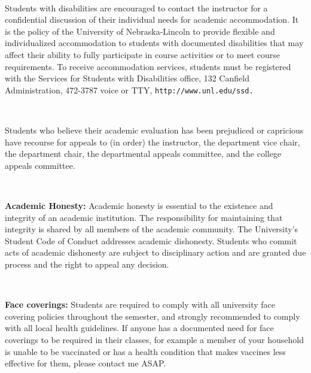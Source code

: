 \documentclass{amsart}
\begin{document}
\

 Students with disabilities are encouraged to contact the instructor for a confidential discussion of their
individual needs for academic accommodation. It is the policy of the University of Nebraska-Lincoln to provide flexible and individualized accommodation to
students with documented disabilities that may affect their ability to fully participate in course activities or to meet course requirements. To receive
accommodation services, students must be registered with the Services for Students with Disabilities office, 132 Canfield Administration, 472-3787 voice or TTY,
{\tt http://www.unl.edu/ssd.}


\


 Students who believe their academic evaluation has been prejudiced or capricious have recourse for appeals to (in
order) the instructor, the department vice chair, the department chair, the departmental appeals committee, and the college appeals committee. 

\

\noindent
{\bf Academic Honesty:}
Academic honesty is essential to the existence and integrity of an academic institution. The responsibility for maintaining that integrity is shared by all members of the academic community. The University's Student Code of Conduct addresses academic dishonesty. Students who commit acts of academic dishonesty are subject to disciplinary action and are granted due process and the right to appeal any decision.


\

\noindent
{\bf Face coverings:} Students are required to comply with all university face covering policies throughout the semester, and strongly recommended to comply with all local health guidelines. If anyone has a documented need for face coverings to be required in their classes, for example a member of your household is unable to be vaccinated or has a health condition that makes vaccines less effective for them, please contact me ASAP.


\vfill
\pagebreak
\smallskip
%
\end{document}
